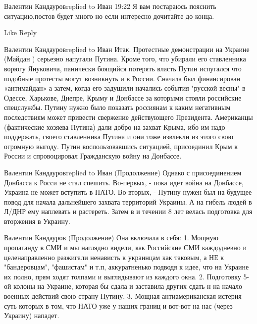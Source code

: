  
 
 
 
 



Валентин Кандауровreplied to Иван
19:22
Я вам постараюсь пояснить ситуацию,постов будет много но если интересно дочитайте до конца.

    Like
    Reply

Валентин Кандауровreplied to Иван
Итак. Протестные демонстрации на Украине (Майдан ) серьезно напугали Путина. Кроме того, что убирали его ставленника ворюгу Януковича, панически боящийся потерять власть Путин испугался что подобные протесты могут возникнуть и в России. Сначала был финансирован «антимайдан» а затем, когда его задушили начались события "русской весны" в Одессе, Харькове, Днепре, Крыму и Донбассе за которыми стояли российские спецслужбы. Путину нужно было показать россиянам к каким негативным последствиям может привести свержение действующего Президента. Американцы (фактические хозяева Путина) дали добро на захват Крыма, ибо им надо поддержать, своего ставленника Путина и они тоже извлекли из этого свою огромную выгоду. Путин воспользовавшись ситуацией, присоединил Крым к России и спровоцировал Гражданскую войну на Донбассе.

Валентин Кандауровreplied to Иван
(Продолжение) Однако с присоединением Донбасса к Росси не стал спешить. Во-первых, - пока идет война на Донбассе, Украина не может вступить в НАТО. Во-вторых, - Путину нужен был на будущее повод для начала дальнейшего захвата территорий Украины. А на гибель людей в Л/ДНР ему наплевать и растереть. Затем в и течении 8 лет велась подготовка для вторжения в Украину.

Валентин Кандауров
(Продолжение) Она включала в себя: 1. Мощную пропаганду в СМИ и мы наглядно видели, как Российские СМИ каждодневно и целенаправленно разжигали ненависть к украинцам как таковым, а НЕ к "бандеровцам", "фашистам" и т.п, аккуратненько подводя к идее, что на Украине их полно, прям ходят толпами и выглядывают из каждого окна. 2. Подготовку 5-ой колоны на Украине, которая бы сдала и заставила других сдать н на начало военных действий свою страну Путину. 3. Мощная антиамериканская истерия суть которых в том, что НАТО уже у наших границ и вот-вот на нас (через Украину) нападет.

